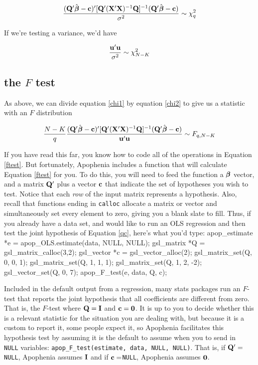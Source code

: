 \begin{equation}		\label{chi1}
{({\bf Q}'\hat{{\mbox{\boldmath$\beta$}}}- {\bf c})' [{\bf Q}' ({\bf X}'{\bf X})^{-1} {\bf Q}]^{-1} ({\bf Q}' \hat{{\mbox{\boldmath$\beta$}}}- {\bf c})
\over \sigma^2} \sim \chi^2_q
\end{equation}

If we're testing a variance, we'd have 

\begin{equation}		\label{chi2}
{{\bf u}' {\bf u} \over \sigma^2} \sim \chi^2_{N-K}
\end{equation}


\subsection{the $F$ test}

As above, we can divide equation \ref{chi1} by equation \ref{chi2} to give us a statistic
with an $F$ distribution

\begin{equation}	
{N-K\over q}
{({\bf Q}'\hat{{\mbox{\boldmath$\beta$}}}- {\bf c})' [{\bf Q}' ({\bf X}'{\bf X})^{-1} {\bf Q}]^{-1} ({\bf Q}' \hat{{\mbox{\boldmath$\beta$}}}- {\bf c})
\over {\bf u}' {\bf u}} \sim F_{q,N-K} \label{ftest}
\end{equation}	

If you have read this far, you know how to code all of the operations
in Equation \ref{ftest}.  But fortunately, 
Apophenia includes a function that will calculate Equation \ref{ftest}
for you.
To do this, you will need to feed the function a ${\mbox{\boldmath$\beta$}}$ vector, and a
matrix ${\bf Q}'$ plus a vector ${\bf c}$ that indicate the set of hypotheses
you wish to test. Notice that each {\em row} of the input matrix represents a
hypothesis. Also, recall that functions ending in {\tt calloc} allocate
a matrix or vector and simultaneously set every element to zero, giving
you a blank slate to fill. Thus, if you already have a data set, and
would like to run an OLS regression and then test the joint hypothesis
of Equation \ref{qc}, here's what you'd type:
apop_estimate *e = apop_OLS.estimate(data, NULL, NULL);
gsl_matrix *Q   = gsl_matrix_calloc(3,2);
gsl_vector *c   = gsl_vector_alloc(2);
gsl_matrix_set(Q, 0, 0, 1);
gsl_matrix_set(Q, 1, 1, 1);
gsl_matrix_set(Q, 1, 2, -2);
gsl_vector_set(Q, 0, 7);
apop_F_test(e, data, Q, c);

Included in the default output from a regression,
many stats packages run an $F$-test that reports the
joint hypothesis that all coefficients are different from zero. That is,
the $F$-test where ${\bf Q} = {\bf I}$ and ${\bf c} = {\bf 0}$. It is up to you
to decide whether this is a relevant statistic for the situation you are
dealing with, but because it is a custom to report it, some people expect it,
so
Apophenia facilitates this hypothesis test by assuming it is the default to assume when you to send in {\tt
NULL} variables: {\tt apop\_F\_test(estimate, data, NULL, NULL)}. That is, if
${\bf Q}'=${\tt NULL}, Apophenia assumes ${\bf I}$ and if ${\bf c}=${\tt NULL},
Apophenia assumes ${\bf 0}$.




